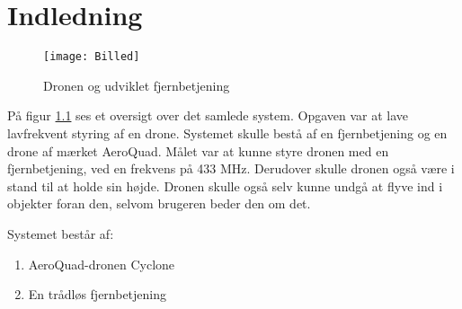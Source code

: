 \documentclass[Main]{subfiles}
\begin{document}
\chapter{Indledning}

\begin{figure}[H]
\centering
\texttt{[image: Billed]}
\caption{Dronen og udviklet fjernbetjening}
\label{Fig:Billed}
\end{figure}

På figur \ref{Fig:Billed} ses et oversigt over det samlede system. 
Opgaven var at lave lavfrekvent styring af en drone.
Systemet skulle bestå af en fjernbetjening og en drone af mærket AeroQuad. 
Målet var at kunne styre dronen med en fjernbetjening, ved en frekvens på 433 MHz. 
Derudover skulle dronen også være i stand til at holde sin højde. 
Dronen skulle også selv kunne undgå at flyve ind i objekter foran den, selvom brugeren beder den om det.

Systemet består af:
\begin{enumerate}
\item AeroQuad-dronen Cyclone
\item En trådløs fjernbetjening
\end{enumerate}
\end{document}
